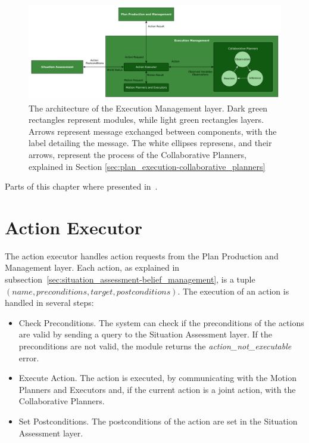 \begin{figure}[h!]
	\centering
	\includegraphics[clip,scale=0.38]{img/plan_execution/architecture.pdf}
	\caption[The architecture of the Execution Management layer]{The architecture of the Execution Management layer. Dark green rectangles represent modules, while light green rectangles layers. Arrows represent message exchanged between components, with the label detailing the message. The white ellipses represens, and their arrows, represent the process of the Collaborative Planners, explained in Section \ref{sec:plan_execution-collaborative_planners} }
	\label{fig:plan_execution:architecture}
\end{figure}


Parts of this chapter where presented in~\cite{fioreiser2014}.

\section{Action Executor}
\label{sec:plan_execution-action_executor}
The action executor handles action requests from the Plan Production and Management layer. Each action, as explained in subsection~\ref{sec:situation_assessment-belief_management}, is a tuple $(name, preconditions, target, postconditions)$. The execution of an action is handled in several steps:
\begin{itemize}
\item Check Preconditions. The system can check if the preconditions of the actions are valid by sending a query to the Situation Assessment layer. If the preconditions are not valid, the module returns the \textit{action\_not\_executable} error.
\item Execute Action. The action is executed, by communicating with the Motion Planners and Executors and, if the current action is a joint action, with the Collaborative Planners.
\item Set Postconditions. The postconditions of the action are set in the Situation Assessment layer.
\end{itemize}

